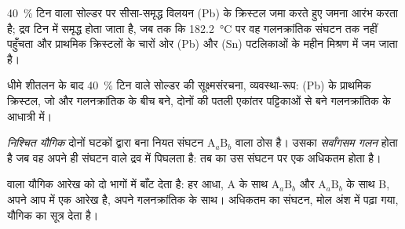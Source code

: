 40~\% टिन वाला सोल्डर  पर सीसा-समृद्ध विलयन (Pb) के क्रिस्टल
जमा करते हुए जमना आरंभ करता है; द्रव टिन में समृद्ध होता जाता है, जब तक कि
\qty{182.2}{\degreeCelsius} पर वह गलनक्रांतिक संघटन तक नहीं पहुँचता और प्राथमिक
क्रिस्टलों के चारों ओर (Pb) और (Sn) पटलिकाओं के महीन मिश्रण में जम जाता है।

\begin{omfigure}

{\small धीमे शीतलन के बाद 40~\% टिन वाले सोल्डर की सूक्ष्मसंरचना, व्यवस्था-रूप:
(Pb) के प्राथमिक क्रिस्टल, जो  और गलनक्रांतिक के बीच बने, दोनों  की पतली एकांतर पट्टिकाओं से बने गलनक्रांतिक के
आधात्री में।}
\end{omfigure}

\begin{definition}[निश्चित यौगिक]\label{def:b2:solid-liquid-diagrams:defined-compound}
\emph{निश्चित यौगिक} दोनों घटकों द्वारा बना नियत
संघटन $\mathrm{A}_a\mathrm{B}_b$ वाला ठोस है। उसका
\emph{सर्वांगसम गलन} होता है जब वह अपने ही संघटन वाले
द्रव में पिघलता है: तब  का उस संघटन पर एक अधिकतम होता है।
\end{definition}

 वाला यौगिक आरेख को दो भागों में बाँट देता है: हर आधा, A के साथ
$\mathrm{A}_a\mathrm{B}_b$ और $\mathrm{A}_a\mathrm{B}_b$ के साथ B, अपने आप में
एक आरेख है, अपने गलनक्रांतिक के साथ। अधिकतम का संघटन, मोल
अंश में पढ़ा गया, यौगिक का सूत्र देता है।

